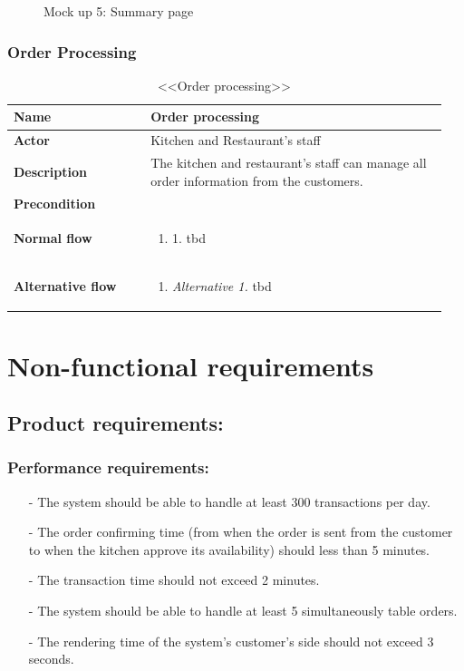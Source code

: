 \documentclass[a4paper,11pt]{extarticle}
\newcommand\tabularhead[2]{
\begin{table}[htbp]
  \caption{<<#1>>}
  \begin{tabular}{|p{0.3\linewidth}|p{0.65\linewidth}|}
    \hline 
    \textbf{Name} & #1 \\
    \hline
    \textbf{Actor} & #2 \\
    \hline}
\newcommand\addrow[2]{\textbf{#1} &#2\\ \hline}
\newcommand\addmulrow[2]{ \begin{minipage}[t][][t]{\linewidth}\textbf{#1}\end{minipage}%
     &\begin{minipage}[t][][t]{\linewidth}
      \begin{enumerate}[wide=0pt] #2   \end{enumerate}
      \smallskip
      \end{minipage} \\ 
      \hline }
\newenvironment{usecase}{\tabularhead}
{\hline\end{tabular}\end{table}}
\begin{document}
\begin{enumerate}[wide=0pt]
\begin{figure}[htbp]
{
            }%
            \caption{Mock up 5: Summary page}
            \label{fig:summary}
        \end{figure}
    \newpage
\end{enumerate}

\newpage
\subsubsection{Order Processing}
\begin{usecase}{Order processing}{Kitchen and Restaurant's staff}
    \addrow{Description}{The kitchen and restaurant's staff can manage all order information from the customers. }
    \addrow{Precondition}{}
    \addmulrow{Normal flow}{
        \item[1.] tbd
    }
    \addmulrow{Alternative flow}{
        \item[\emph{Alternative 1.}] tbd
        }
\end{usecase}
\newpage

\section{Non-functional requirements}

\subsection{Product requirements:}
\subsubsection{Performance requirements:}
\begin{itemize}[wide=0pt]
    \item[-] The system should be able to handle at least 300 transactions per day.
    \item[-] The order confirming time (from when the order is sent from the customer to when the kitchen approve its availability) should less than 5 minutes.
    \item[-] The transaction time should not exceed 2 minutes.
    \item[-] The system should be able to handle at least 5 simultaneously table orders.
    \item[-] The rendering time of the system's customer's side should not exceed 3 seconds.
\end{itemize}
\end{document}
